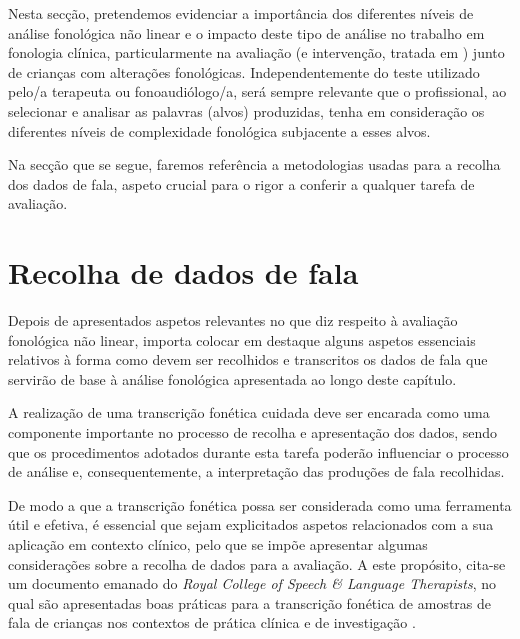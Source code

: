 \documentclass[output=paper,colorlinks,citecolor=brown,booklanguage=portuguese]{langscibook}
\begin{document}
Nesta secção, pretendemos evidenciar a importância dos diferentes níveis de análise fonológica não linear e o impacto deste tipo de análise no trabalho em fonologia clínica, particularmente na avaliação (e intervenção, tratada em ) junto de crianças com alterações fonológicas. Independentemente do teste utilizado pelo/a terapeuta ou fonoaudiólogo/a, será sempre relevante que o profissional, ao selecionar e analisar as palavras (alvos) produzidas, tenha em consideração os diferentes níveis de complexidade fonológica subjacente a esses alvos. 

Na secção que se segue, faremos referência a metodologias usadas para a recolha dos dados de fala, aspeto crucial para o rigor a conferir a qualquer tarefa de avaliação.

\section{Recolha de dados de fala}\label{sec:cap6sec3}
Depois de apresentados aspetos relevantes no que diz respeito à avaliação fonológica não linear, importa colocar em destaque alguns aspetos essenciais relativos à forma como devem ser recolhidos e transcritos os dados de fala que servirão de base à análise fonológica apresentada ao longo deste capítulo.

A realização de uma transcrição fonética cuidada deve ser encarada como uma componente importante no processo de recolha e apresentação dos dados, sendo que os procedimentos adotados durante esta tarefa poderão influenciar o processo de análise e, consequentemente, a interpretação das produções de fala recolhidas.

De modo a que a transcrição fonética possa ser considerada como uma ferramenta útil e efetiva, é essencial que sejam explicitados aspetos relacionados com a sua aplicação em contexto clínico, pelo que se impõe apresentar algumas considerações sobre a recolha de dados para a avaliação. A este propósito, cita-se um documento emanado do \emph{Royal College of Speech \& Language Therapists}, no qual são apresentadas boas práticas para a transcrição fonética de amostras de fala de crianças nos contextos de prática clínica e de investigação \citep{Bates2017}.
\end{document}
